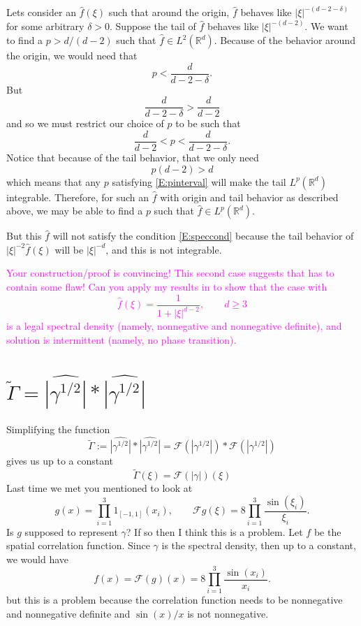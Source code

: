 \documentclass{article}
\numberwithin{equation}{section}
\newcommand{\R}{\mathbb{R}}
\begin{document}
Lets consider an $\hat{f}(\xi)$ such that around the origin, $\hat{f}$ behaves like $|\xi|^{-(d-2-\delta)}$ for some arbitrary $\delta >0$. Suppose the tail of $\hat{f}$ behaves like $|\xi|^{-(d-2)}$. We want to find a $p > d/(d-2)$ such that $\hat{f} \in L^2(\R^d)$.  Because of the behavior around the origin, we would need that
	\[
		p < \frac{d}{d-2-\delta}.
	\]
But
	\[
		\frac{d}{d-2-\delta} > \frac{d}{d-2}
	\]
and so we must restrict our choice of $p$ to be such that
	\begin{equation}\label{E:pinterval}
		\frac{d}{d-2} < p < \frac{d}{d-2-\delta} .
	\end{equation}
Notice that because of the tail behavior, that we only need
	\[
		p(d-2) > d
	\]
which means that any $p$ satisfying \eqref{E:pinterval} will make the tail $L^p(\R^d)$ integrable. Therefore, for such an $\hat{f}$ with origin and tail behavior as described above, we may be able to find a $p$ such that $\hat{f} \in L^p(\R^d)$.

But this $\hat{f}$ will not satisfy the condition \eqref{E:speccond} because the tail behavior of $|\xi|^{-2}\hat{f}(\xi)$ will be $|\xi|^{-d}$, and this is not integrable.

\bigskip
\textcolor{magenta}{Your construction/proof is convincing! This second case suggests that
\cite{TZ98} has to contain some flaw! Can you apply my results in \cite{CK19} to show that the case
with
\begin{equation*}
	\widehat{f} (\xi) = \frac{1}{1+|\xi|^{d-2}} , \qquad d\ge 3
\end{equation*}
is a legal spectral density (namely, nonnegative and nonnegative definite), and solution is
intermittent (namely, no phase transition).
}

\section{$\tilde{\Gamma} = \widehat{|\gamma^{1/2}|} *  \widehat{|\gamma^{1/2}|}$  }
Simplifying the function
	\begin{equation}\label{E:GammaTilde}
		\tilde{\Gamma} := \widehat{|\gamma^{1/2}|} *  \widehat{|\gamma^{1/2}|} = \mathcal{F}(|\gamma^{1/2}|) * \mathcal{F}(|\gamma^{1/2}|)
	\end{equation}
gives us up to a constant
	\[
		\tilde{\Gamma}(\xi) = \mathcal{F}(|\gamma|)(\xi)
	\]
Last time we met you mentioned to look at
	\[
		g(x) = \prod_{i=1}^3 1_{[-1,1]}(x_i), \quad \quad \mathcal{F}g(\xi) = 8\prod_{i=1}^3 \frac{\sin(\xi_i)}{\xi_i}.
	\]
Is $g$ supposed to represent $\gamma$? If so then I think this is a problem. Let $f$ be the spatial correlation function. Since $\gamma$ is the spectral density, then up to a constant, we would have
	\[
		f(x) = \mathcal{F}(g)(x) = 8\prod_{i=1}^3 \frac{\sin(x_i)}{x_i}.
	\]
but this is a problem because the correlation function needs to be nonnegative and nonnegative definite and $\sin(x)/x$ is not nonnegative.
\end{document}
